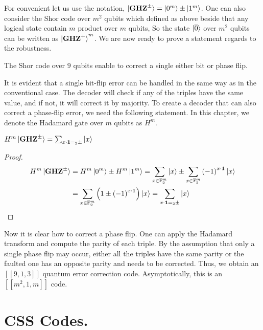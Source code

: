 For convenient let us use the notation, $\ket{\mathbf{GHZ}^{\pm}} =  \ket{0^{m}} \pm  \ket{1^{m}}$. One can also consider the Shor code over $m^{2}$ qubits which defined as above beside that any logical state contain $m$ product over $m$ qubits, So the state $\ket{\overline{0}}$ over $m^{2}$ qubits can be written as $\ket{\mathbf{GHZ}^{+}}^{m}$. We are now ready to prove a statement regards to the robustness.  

\begin{lemma}
  The Shor code over $9$ qubits enable to correct a single either bit or phase flip.  
\end{lemma}
It is evident that a single bit-flip error can be handled in the same way as in the conventional case. The decoder will check if any of the triples have the same value, and if not, it will correct it by majority. To create a decoder that can also correct a phase-flip error, we need the following statement. In this chapter, we denote the Hadamard gate over $m$ qubits as $H^m$.
\begin{claim}
   $H^{m}\ket{\mathbf{GHZ}^{\pm}} = \sum_{ x \cdot \mathbf{1} =_2 \pm }{\ket{x} }$
\end{claim}

\begin{proof}

  \begin{equation*}
    \begin{split}
      H^{m}\ket{\mathbf{GHZ}^{\pm}} & = H^{m}\ket{0^{m}} \pm  H^{m}\ket{1^{m}} = \sum_{x \in \mathbb{F}_{2}^{m}}{\ket{x}} \pm  \sum_{x \in \mathbb{F}_{2}^{m}}{\left( -1 \right)^{x \cdot \mathbf{1}} \ket{x}} \\ & = \sum_{x \in \mathbb{F}_{2}^{m}}{ \left( 1 \pm \left( -1 \right)^{x \cdot \mathbf{1}}  \right) \ket{x} } =  \sum_{x \cdot \mathbf{1} =_2 \pm }{\ket{x} }
    \end{split}
  \end{equation*}
\end{proof}

Now it is clear how to correct a phase flip. One can apply the Hadamard transform and compute the parity of each triple. By the assumption that only a single phase flip may occur, either all the triples have the same parity or the faulted one has an opposite parity and needs to be corrected. Thus, we obtain an $\left[ \left[ 9,1,3 \right] \right]$ quantum error correction code. Asymptotically, this is an $\left[ \left[ m^{2}, 1, m \right] \right]$ code.

\section{CSS Codes.}

